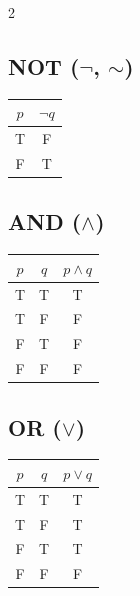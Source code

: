 \smallskip
\begin{multicols}{2}

	\subsection*{NOT (\(\neg\), \(\sim\))}

	\begin{tabular}{|c|c|}
		\toprule
		\(p\) & \(\neg q\) \\
		\midrule
		T     & F          \\
		F     & T          \\
		\bottomrule
	\end{tabular}

	\vspace{1em}

	\subsection*{AND (\(\land\))}

	\begin{tabular}{|c|c|c|}
		\toprule
		\(p\) & \(q\) & \(p \land q\) \\
		\midrule
		T     & T     & T             \\
		T     & F     & F             \\
		F     & T     & F             \\
		F     & F     & F             \\
		\bottomrule
	\end{tabular}

	\vspace{1em}

	\subsection*{OR (\(\lor\))}

	\begin{tabular}{|c|c|c|}
		\toprule
		\(p\) & \(q\) & \(p \lor q\) \\
		\midrule
		T     & T     & T            \\
		T     & F     & T            \\
		F     & T     & T            \\
		F     & F     & F            \\
		\bottomrule
	\end{tabular}

	\vspace{1em}


\end{multicols}
